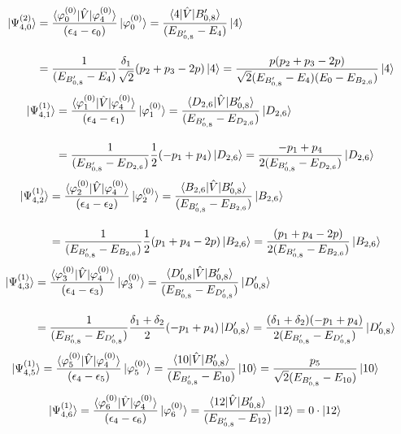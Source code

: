 \begin{align}
    \ket{\Psi_{4,0}^{(2)}}
     &=\frac{\braket{\varphi_{0
     }^{(0)}|\hat{V}|\varphi_{4}^{(0)}}}{(\epsilon_{4}-\epsilon_{0})}\ket{\varphi_{0}^{(0)}}
     =\frac{\braket{4|\hat{V}|B_{0,8}^{\prime}}}{(E_{B_{0,8}^{\prime}}-E_4)}\ket{4}
     \nn[10pt]
     &=
     \frac{1}{(E_{B_{0,8}^{\prime}}-E_4)}
     \frac{\delta_1}{\sqrt{2}}(p_2+p_3-2p)
     \ket{4}
     =
     \frac{p(p_2+p_3-2p)}{\sqrt{2}(E_{B_{0,8}^{\prime}}-E_4)(E_0-E_{B_{2,6}})}
     \ket{4}
\end{align}
\begin{align}
     \ket{\Psi_{4,1}^{(1)}}
     &=
     \frac{\braket{\varphi_{1
     }^{(0)}|\hat{V}|\varphi_{4}^{(0)}}}{(\epsilon_{4}-\epsilon_{1})}\ket{\varphi_{1}^{(0)}}
      =\frac{\braket{D_{2,6}|\hat{V}|B_{0,8}^{\prime}}}{(E_{B_{0,8}^{\prime}}-E_{D_{2,6}})}\ket{D_{2,6}}\nn[10pt]
      &=\frac{1}{(E_{B_{0,8}^{\prime}}-E_{D_{2,6}})}
      \frac{1}{2}(-p_1+p_4)
      \ket{D_{2,6}}
      =\frac{-p_1+p_4}{2(E_{B_{0,8}^{\prime}}-E_{D_{2,6}})}
      \ket{D_{2,6}}
\end{align}
\begin{align}
     \ket{\Psi_{4,2}^{(1)}}
     &=
     \frac{\braket{\varphi_{2
     }^{(0)}|\hat{V}|\varphi_{4}^{(0)}}}{(\epsilon_{4}-\epsilon_{2})}\ket{\varphi_{2}^{(0)}}
      =\frac{\braket{B_{2,6}|\hat{V}|B_{0,8}^{\prime}}}{(E_{B_{0,8}^{\prime}}-E_{B_{2,6}})}\ket{B_{2,6}}\nn[10pt]
      &=\frac{1}{(E_{B_{0,8}^{\prime}}-E_{B_{2,6}})}
      \frac{1}{2}(p_1+p_4-2p)
      \ket{B_{2,6}}
      =\frac{(p_1+p_4-2p)}{2(E_{B_{0,8}^{\prime}}-E_{B_{2,6}})}
      \ket{B_{2,6}}
\end{align}
\begin{align}
     \ket{\Psi_{4,3}^{(1)}}
     &=
     \frac{\braket{\varphi_{3
     }^{(0)}|\hat{V}|\varphi_{4}^{(0)}}}{(\epsilon_{4}-\epsilon_{3})}\ket{\varphi_{3}^{(0)}}
      =\frac{\braket{D_{0,8}^{\prime}|\hat{V}|B_{0,8}^{\prime}}}{(E_{B_{0,8}^{\prime}}-E_{D_{0,8}^{\prime}})}\ket{D_{0,8}^{\prime}}\nn[10pt]
      &=\frac{1}{(E_{B_{0,8}^{\prime}}-E_{D_{0,8}^{\prime}})}
      \frac{\delta_1+\delta_2}{2}(-p_1+p_4)\ket{D_{0,8}^{\prime}}
      =\frac{(\delta_1+\delta_2)(-p_1+p_4)}
      {2(E_{B_{0,8}^{\prime}}-E_{D_{0,8}^{\prime}})}
      \ket{D_{0,8}^{\prime}}
\end{align}
\begin{align}
     \ket{\Psi_{4,5}^{(1)}}
     &=
     \frac{\braket{\varphi_{5
     }^{(0)}|\hat{V}|\varphi_{4}^{(0)}}}{(\epsilon_{4}-\epsilon_{5})}\ket{\varphi_{5}^{(0)}}
      =\frac{\braket{10|\hat{V}|B_{0,8}^{\prime}}}{(E_{B_{0,8}^{\prime}}-E_{10})}\ket{10}
      =\frac{p_5}{\sqrt{2}(E_{B_{0,8}^{\prime}}-E_{10})}\ket{10}
\end{align}
\begin{align}
     \ket{\Psi_{4,6}^{(1)}}
     &=
     \frac{\braket{\varphi_{6
     }^{(0)}|\hat{V}|\varphi_{4}^{(0)}}}{(\epsilon_{4}-\epsilon_{6})}\ket{\varphi_{6}^{(0)}}
      =\frac{\braket{12|\hat{V}|B_{0,8}^{\prime}}}{(E_{B_{0,8}^{\prime}}-E_{12})}\ket{12}=0\cdot\ket{12}
\end{align}


